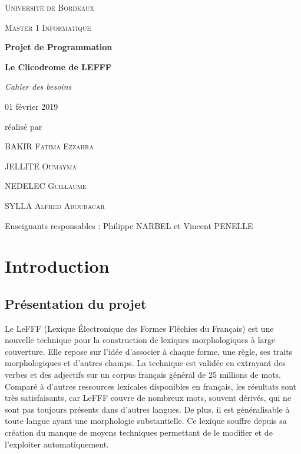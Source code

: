 \documentclass[12pt,a4paper]{article}
\begin{document}
\begin{titlepage}
\centering
{\scshape\LARGE Université de Bordeaux \par}
{\scshape\Large Master 1 Informatique  \par}
\vspace{3cm}

{\Huge\bfseries Projet de Programmation\par}
{\Huge\bfseries Le Clicodrome de LEFFF \par}
\vspace{0.5cm}
{\Large\itshape Cahier des besoins\par}
{\large 01 février 2019\par}

\vfill
réalisé par \par
BAKIR \textsc{Fatima Ezzahra} \par
JELLITE \textsc{Oumayma} \par
NEDELEC \textsc{Guillaume} \par
SYLLA  \textsc{Alfred Aboubacar} \par
\vfill

{\large Enseignants responsables : Philippe NARBEL et Vincent PENELLE\par}

\end{titlepage}

\section{Introduction}

\subsection{Présentation du projet}

Le LeFFF (Lexique Électronique des Formes Fléchies du Français) est une nouvelle technique pour la construction de lexiques morphologiques à large couverture. Elle repose sur l'idée d'associer à chaque forme, une règle, ses traits morphologiques et d'autres champs.
\smallbreak La technique est validée en extrayant des verbes et des adjectifs sur un corpus français général de 25 millions de mots. Comparé à d'autres ressources lexicales disponibles en français, les résultats sont très satisfaisants, car LeFFF couvre de nombreux mots, souvent dérivés, qui ne sont pas toujours présents dans d’autres langues. 
De plus, il est généralisable à toute langue ayant une morphologie substantielle.
\smallbreak Ce lexique souffre depuis sa création du manque de moyens techniques permettant de le modifier et de l'exploiter automatiquement.
\end{document}
